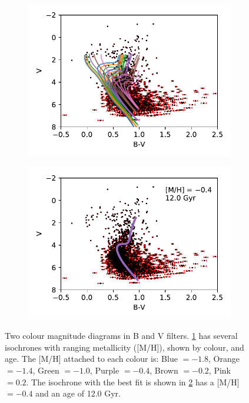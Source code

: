 \documentclass[11pt]{article}
\begin{document}
\begin{figure}[H]
	\centering
	\begin{subfigure}[b]{0.49\textwidth}
		\centering
		\includegraphics[width=\textwidth]{../Figures/manyiso}
		\caption{}
		\label{fig:isomany}
	\end{subfigure}
	\hfill
	\begin{subfigure}[b]{0.49\textwidth}
		\centering
		\includegraphics[width=\textwidth]{../Figures/singiso}
		\caption{}
		\label{fig:singiso}
	\end{subfigure}
	\caption{Two colour magnitude diagrams in B and V filters. \ref{fig:isomany} has several isochrones with ranging metallicity ([M/H]), shown by colour, and age. The [M/H] attached to each colour is: Blue $= -1.8$, Orange $= -1.4$, Green $= -1.0$, Purple $= -0.4$, Brown $= -0.2$, Pink $= 0.2$. The isochrone with the best fit is shown in \ref{fig:singiso} has a [M/H] $=-0.4$ and an age of 12.0 Gyr. }
	\label{fig:iso}
\end{figure}
\end{document}
